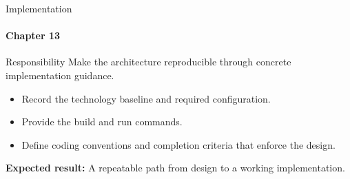 \begin{frame}{Implementation}
\framesubtitle{Chapter 13}
\begin{block}{Responsibility}
Make the architecture reproducible through concrete implementation guidance.
\end{block}
\begin{itemize}
  \item Record the technology baseline and required configuration.
  \item Provide the build and run commands.
  \item Define coding conventions and completion criteria that enforce the design.
\end{itemize}
\vspace{0.15cm}
\textbf{Expected result:} A repeatable path from design to a working implementation.
\end{frame}
